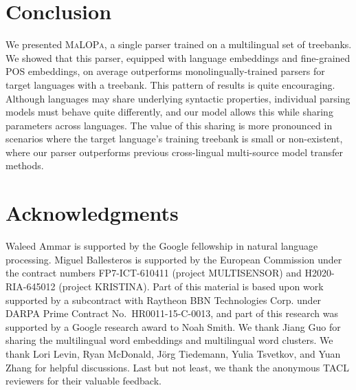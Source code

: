 \documentclass[11pt]{article}
\newcommand{\malopa}{\textsc{MaLOPa}}
\begin{document}
\section{Conclusion}
We presented \malopa, a single parser trained on a multilingual set of treebanks.
We showed that this parser, equipped with language embeddings and fine-grained POS embeddings, on average outperforms monolingually-trained parsers for target languages with a treebank. This pattern of results is quite encouraging. Although languages may share underlying syntactic properties, individual parsing models must behave quite differently, and our model allows this while sharing parameters across languages. The value of this sharing is more pronounced in scenarios where the target language's training treebank is small or non-existent, where our parser outperforms previous cross-lingual multi-source model transfer methods.

\section*{Acknowledgments}
Waleed Ammar is supported by the Google fellowship in natural language processing.
Miguel Ballesteros is supported by the European Commission under the contract numbers FP7-ICT-610411 (project MULTISENSOR) and H2020-RIA-645012 (project KRISTINA).
Part of this material is based upon work supported by a subcontract with Raytheon BBN Technologies Corp. under DARPA Prime Contract  No.~HR0011-15-C-0013, and part of this research was supported by a Google research award to Noah Smith.
We thank Jiang Guo for sharing the multilingual word embeddings and multilingual word clusters.
We thank Lori Levin, Ryan McDonald, J\"{o}rg Tiedemann, Yulia Tsvetkov, and Yuan Zhang for helpful discussions.
Last but not least, we thank the anonymous TACL reviewers for their valuable feedback.



\end{document}
